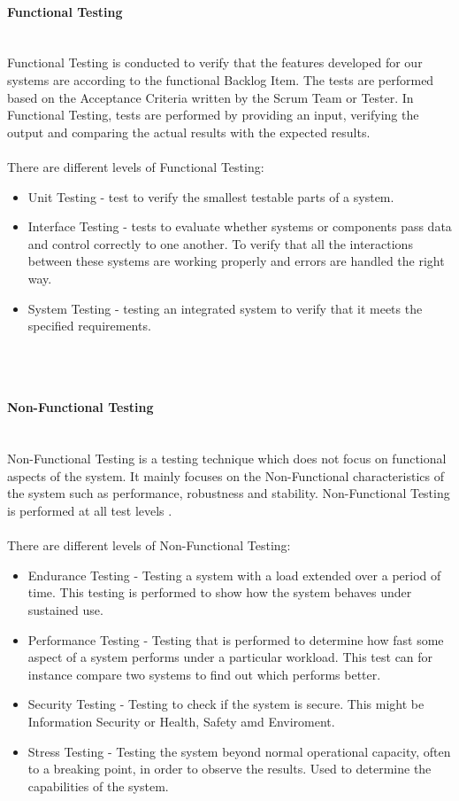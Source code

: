 \paragraph{Functional Testing} \\
Functional Testing is conducted to verify that the features developed for our systems are according to the functional Backlog Item. The tests are performed based on the Acceptance Criteria written by the Scrum Team or Tester. In Functional Testing, tests are performed by providing an input, verifying the output and comparing the actual results with the expected results.\\
\\
There are different levels of Functional Testing: 
\begin{itemize}
  \item Unit Testing - test to verify the smallest testable parts of a system. 
  \item Interface Testing - tests to evaluate whether systems or components pass data and control correctly to one another. To verify that all the interactions between these systems are working properly and errors are handled the right way. 
  \item System Testing - testing an integrated system to verify that it meets the specified requirements. 
\end{itemize}\\
\\
\paragraph{Non-Functional Testing} \\
Non-Functional Testing is a testing technique which does not focus on functional aspects of the system. It mainly focuses on the Non-Functional characteristics of the system such as performance, robustness and stability. Non-Functional Testing is performed at all test levels \cite{ref6}.\\
\\
There are different levels of Non-Functional Testing: 
\begin{itemize}
  \item Endurance Testing - Testing a system with a load extended over a period of time. This testing is performed to show how the system behaves under sustained use. 
  \item Performance Testing - Testing that is performed to determine how fast some aspect of a system performs under a particular workload. This test can for instance compare two systems to find out which performs better.
  \item Security Testing - Testing to check if the system is secure. This might be Information Security or Health, Safety amd Enviroment. 
  \item Stress Testing - Testing the system beyond normal operational capacity, often to a breaking point, in order to observe the results. Used to determine the capabilities of the system. 
\end{itemize}\\
\\
